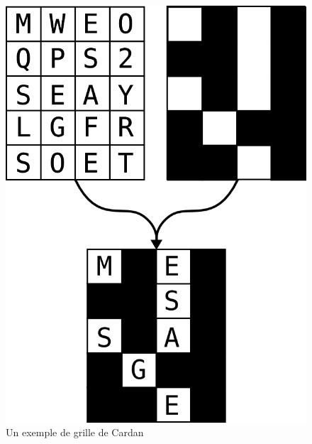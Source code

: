 \begin{figure}
  \begin{center}
    \includegraphics[scale=0.2]{images/GrilleCardan.png}
  \end{center}
  \caption{Un exemple de grille de Cardan}
  \label{fig:GrilleCardan}
  \vspace{-10pt}
\end{figure}


